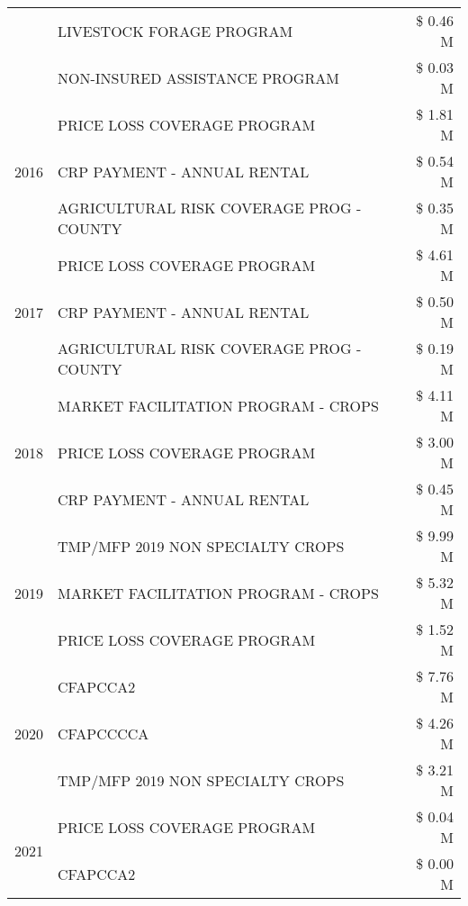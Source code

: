 \begin{tabular}{llr}
 & LIVESTOCK FORAGE PROGRAM & \$ 0.46 M \\
 & NON-INSURED ASSISTANCE PROGRAM & \$ 0.03 M \\
\cline{1-3}
\multirow[t]{3}{*}{2016} & PRICE LOSS COVERAGE PROGRAM & \$ 1.81 M \\
 & CRP PAYMENT - ANNUAL RENTAL & \$ 0.54 M \\
 & AGRICULTURAL RISK COVERAGE PROG - COUNTY & \$ 0.35 M \\
\cline{1-3}
\multirow[t]{3}{*}{2017} & PRICE LOSS COVERAGE PROGRAM & \$ 4.61 M \\
 & CRP PAYMENT - ANNUAL RENTAL & \$ 0.50 M \\
 & AGRICULTURAL RISK COVERAGE PROG - COUNTY & \$ 0.19 M \\
\cline{1-3}
\multirow[t]{3}{*}{2018} & MARKET FACILITATION PROGRAM - CROPS & \$ 4.11 M \\
 & PRICE LOSS COVERAGE PROGRAM & \$ 3.00 M \\
 & CRP PAYMENT - ANNUAL RENTAL & \$ 0.45 M \\
\cline{1-3}
\multirow[t]{3}{*}{2019} & TMP/MFP 2019 NON SPECIALTY CROPS & \$ 9.99 M \\
 & MARKET FACILITATION PROGRAM - CROPS & \$ 5.32 M \\
 & PRICE LOSS COVERAGE PROGRAM & \$ 1.52 M \\
\cline{1-3}
\multirow[t]{3}{*}{2020} & CFAPCCA2 & \$ 7.76 M \\
 & CFAPCCCCA & \$ 4.26 M \\
 & TMP/MFP 2019 NON SPECIALTY CROPS & \$ 3.21 M \\
\cline{1-3}
\multirow[t]{2}{*}{2021} & PRICE LOSS COVERAGE PROGRAM & \$ 0.04 M \\
 & CFAPCCA2 & \$ 0.00 M \\
\cline{1-3}
\bottomrule
\end{tabular}
